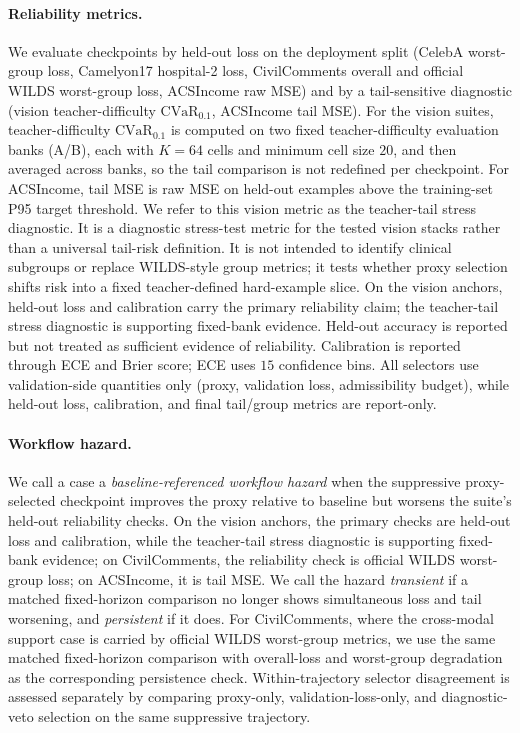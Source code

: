 \paragraph{Reliability metrics.}
We evaluate checkpoints by held-out loss on the deployment split (CelebA worst-group loss, Camelyon17 hospital-2 loss, CivilComments overall and official WILDS worst-group loss, ACSIncome raw MSE) and by a tail-sensitive diagnostic (vision teacher-difficulty $\mathrm{CVaR}_{0.1}$, ACSIncome tail MSE).
For the vision suites, teacher-difficulty $\mathrm{CVaR}_{0.1}$ is computed on two fixed teacher-difficulty evaluation banks (A/B), each with $K=64$ cells and minimum cell size $20$, and then averaged across banks, so the tail comparison is not redefined per checkpoint.
For ACSIncome, tail MSE is raw MSE on held-out examples above the training-set P95 target threshold.
We refer to this vision metric as the teacher-tail stress diagnostic.
It is a diagnostic stress-test metric for the tested vision stacks rather than a universal tail-risk definition.
It is not intended to identify clinical subgroups or replace WILDS-style group metrics; it tests whether proxy selection shifts risk into a fixed teacher-defined hard-example slice.
On the vision anchors, held-out loss and calibration carry the primary reliability claim; the teacher-tail stress diagnostic is supporting fixed-bank evidence.
Held-out accuracy is reported but not treated as sufficient evidence of reliability.
Calibration is reported through ECE and Brier score; ECE uses $15$ confidence bins.
All selectors use validation-side quantities only (proxy, validation loss, admissibility budget), while held-out loss, calibration, and final tail/group metrics are report-only.

\paragraph{Workflow hazard.}
We call a case a \emph{baseline-referenced workflow hazard} when the suppressive proxy-selected checkpoint improves the proxy relative to baseline but worsens the suite's held-out reliability checks.
On the vision anchors, the primary checks are held-out loss and calibration, while the teacher-tail stress diagnostic is supporting fixed-bank evidence; on CivilComments, the reliability check is official WILDS worst-group loss; on ACSIncome, it is tail MSE.
We call the hazard \emph{transient} if a matched fixed-horizon comparison no longer shows simultaneous loss and tail worsening, and \emph{persistent} if it does.
For CivilComments, where the cross-modal support case is carried by official WILDS worst-group metrics, we use the same matched fixed-horizon comparison with overall-loss and worst-group degradation as the corresponding persistence check.
Within-trajectory selector disagreement is assessed separately by comparing proxy-only, validation-loss-only, and diagnostic-veto selection on the same suppressive trajectory.

